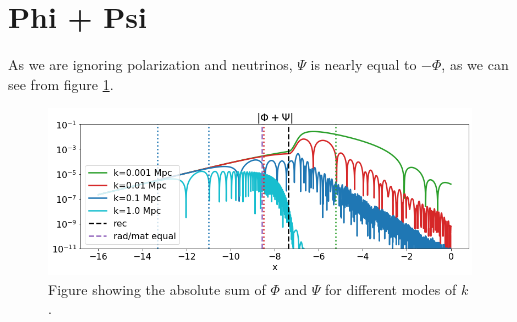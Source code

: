 \documentclass[10pt, a4paper]{article}
\begin{document}
\appendix
\section{Phi + Psi}
As we are ignoring polarization and neutrinos, $\Psi$ is nearly equal to $-\Phi$, as we can see from figure \ref{fig:Psi_plus_Phi}.
\begin{figure}[H]
    \centering
    \includegraphics[scale=0.4]{../m3_figs/Psi_plus_Phi.png}
    \caption{Figure showing the absolute sum of $\Phi$ and $\Psi$ for different modes of $k$.}
    \label{fig:Psi_plus_Phi}
\end{figure}








\end{document}
